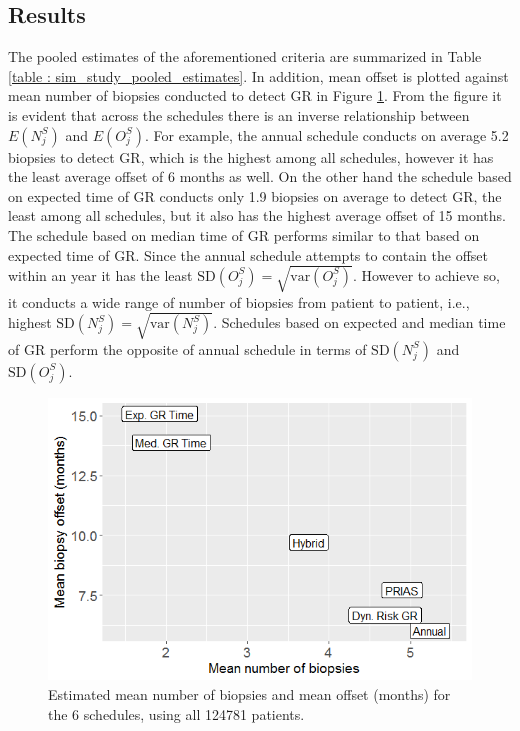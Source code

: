 \subsection{Results}
The pooled estimates of the aforementioned criteria are summarized in Table \ref{table : sim_study_pooled_estimates}. In addition, mean offset is plotted against mean number of biopsies conducted to detect GR in Figure \ref{fig : meanNbVsOffset}. From the figure it is evident that across the schedules there is an inverse relationship between $E(N^S_j)$ and $E(O^S_j)$. For example, the annual schedule conducts on average 5.2 biopsies to detect GR, which is the highest among all schedules, however it has the least average offset of 6 months as well. On the other hand the schedule based on expected time of GR conducts only 1.9 biopsies on average to detect GR, the least among all schedules, but it also has the highest average offset of 15 months. The schedule based on median time of GR performs similar to that based on expected time of GR. Since the annual schedule attempts to contain the offset within an year it has the least $\mbox{SD}(O^S_j) = \sqrt{\mbox{var}(O^S_j)}$. However to achieve so, it conducts a wide range of number of biopsies from patient to patient, i.e., highest $\mbox{SD}(N^S_j) = \sqrt{\mbox{var}(N^S_j)}$. Schedules based on expected and median time of GR perform the opposite of annual schedule in terms of $\mbox{SD}(N^S_j)$ and $\mbox{SD}(O^S_j)$.

\begin{figure}
\centerline{\includegraphics[width=\columnwidth]{images/sim_study/meanNbVsOffset_all.png}}
\caption{Estimated mean number of biopsies and mean offset (months) for the 6 schedules, using all 124781 patients.}
\label{fig : meanNbVsOffset}
\end{figure}

